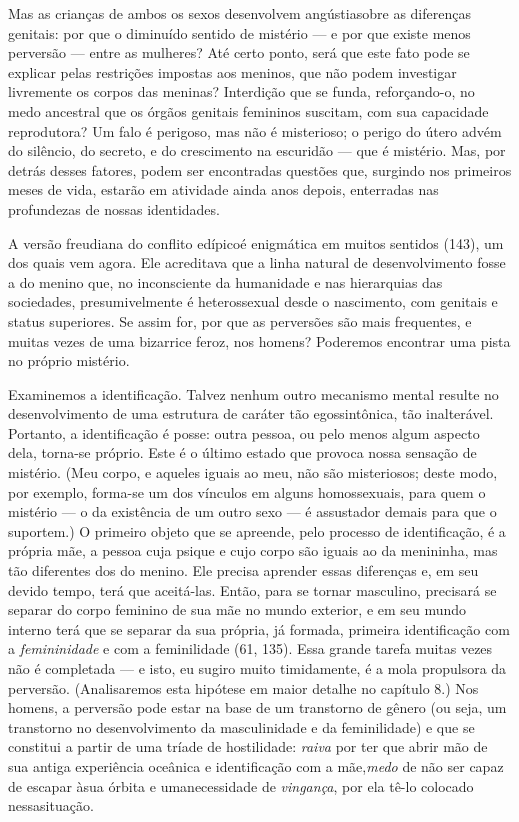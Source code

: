 Mas as crianças de ambos os sexos desenvolvem angústia\idxinfanangu[|(] sobre as
diferenças genitais: por que o diminuído sentido de mistério --- e por
que existe menos perversão --- entre as mulheres? Até certo ponto,
será que este fato pode se explicar pelas restrições impostas aos
meninos, que não podem investigar livremente os corpos das meninas?
Interdição que se funda, reforçando-o, no medo ancestral que os órgãos
genitais femininos suscitam, com sua capacidade reprodutora? Um falo é
perigoso, mas não é misterioso; o perigo do útero advém do silêncio, do
secreto, e do crescimento na escuridão --- que é mistério. Mas, por
detrás desses fatores, podem ser encontradas questões que, surgindo nos
primeiros meses de vida, estarão em atividade ainda anos depois,
enterradas nas profundezas de nossas identidades.

A versão freudiana do conflito edípico\idxfreudedipo[|(] é enigmática em muitos
sentidos (143), um dos quais vem agora. Ele acreditava que a linha
natural de desenvolvimento fosse a do menino que, no inconsciente da
humanidade e nas hierarquias das sociedades, presumivelmente é
heterossexual desde o nascimento, com genitais e status superiores. Se
assim for, por que as perversões são mais frequentes, e muitas vezes de
uma bizarrice feroz, nos homens? Poderemos encontrar uma pista no
próprio mistério.

Examinemos a identificação.\idxidentconf{} Talvez nenhum outro mecanismo mental
resulte no desenvolvimento de uma estrutura de caráter tão
egossintônica, tão inalterável. Portanto, a identificação é posse:
outra pessoa, ou pelo menos algum aspecto dela, torna-se próprio. Este
é o último estado que provoca nossa sensação de mistério. (Meu corpo, e
aqueles iguais ao meu, não são misteriosos; deste modo, por exemplo,
forma-se um dos vínculos em alguns homossexuais, para quem o mistério
--- o da existência de um outro sexo --- é assustador demais para que
o suportem.) O primeiro objeto que se apreende, pelo processo de
identificação, é a própria mãe, a pessoa cuja psique e cujo corpo são
iguais ao da menininha, mas tão diferentes dos do menino. Ele precisa
aprender essas diferenças e, em seu devido tempo, terá que aceitá-las.
Então, para se tornar masculino, precisará se separar do corpo feminino
de sua mãe no mundo exterior, e em seu mundo interno terá que se
separar da sua própria, já formada, primeira identificação com a
\emph{femininidade} e com a feminilidade (61, 135). Essa grande tarefa                   %
muitas vezes não é completada --- e isto, eu sugiro muito timidamente,
é a mola propulsora da perversão. (Analisaremos esta hipótese em
maior detalhe no capítulo 8.) Nos homens, a perversão pode estar na
base de um\idxpervtrans{} transtorno de gênero\idxiden{} (ou seja, um transtorno no
desenvolvimento da masculinidade e da feminilidade) e que se constitui
a partir de uma tríade\idxhosttria{} de hostilidade: \textit{raiva} por ter que abrir
mão de sua antiga experiência oceânica e identificação com a mãe,\idxsexuo[|)]
\textit{medo}\idxhomosmedo{} de não ser capaz de escapar à\idxvoy[|)] sua órbita e uma\idxpervpredo[|)]
necessidade de \textit{vingança}, por ela tê-lo colocado nessa\idxfreudedipo[|)]
situação.

